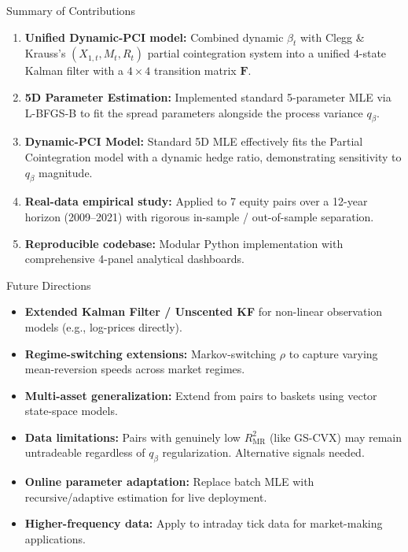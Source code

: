 \documentclass[10pt, aspectratio=169]{beamer}
\begin{document}
\begin{frame}{Summary of Contributions}
  \begin{enumerate}
    \item \textbf{Unified Dynamic-PCI model:} Combined dynamic
          $\beta_t$ with Clegg \& Krauss's $(X_{1,t}, M_t, R_t)$ partial
          cointegration system into a unified $4$-state Kalman filter with
          a $4 \times 4$ transition matrix $\bm{F}$.
    \item \textbf{5D Parameter Estimation:}
          Implemented standard 5-parameter MLE via L-BFGS-B to fit the spread parameters alongside the process variance $q_\beta$.
    \item \textbf{Dynamic-PCI Model:} Standard 5D MLE effectively fits the Partial Cointegration model with a dynamic hedge ratio, demonstrating sensitivity to $q_\beta$ magnitude.
    \item \textbf{Real-data empirical study:} Applied to 7 equity pairs
          over a 12-year horizon (2009--2021) with rigorous in-sample /
          out-of-sample separation.
    \item \textbf{Reproducible codebase:} Modular Python implementation
          with comprehensive 4-panel analytical dashboards.
  \end{enumerate}
\end{frame}

\begin{frame}{Future Directions}
  \begin{itemize}
    \item \textbf{Extended Kalman Filter / Unscented KF} for non-linear
          observation models (e.g., log-prices directly).
    \item \textbf{Regime-switching extensions:} Markov-switching $\rho$ to
          capture varying mean-reversion speeds across market regimes.
    \item \textbf{Multi-asset generalization:} Extend from pairs to
          baskets using vector state-space models.
    \item \textbf{Data limitations:} Pairs with genuinely low $R^2_{\text{MR}}$ (like GS-CVX) may remain
          untradeable regardless of $q_\beta$ regularization. Alternative signals needed.
    \item \textbf{Online parameter adaptation:} Replace batch MLE with
          recursive/adaptive estimation for live deployment.
    \item \textbf{Higher-frequency data:} Apply to intraday tick data for
          market-making applications.
  \end{itemize}
\end{frame}
\end{document}
